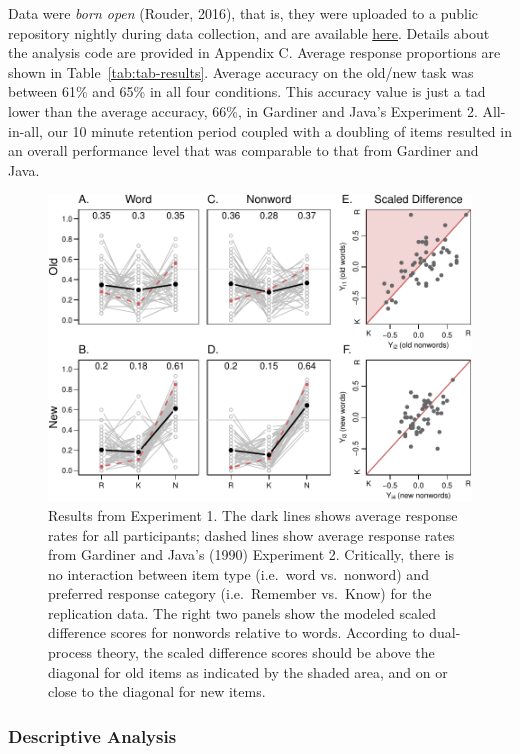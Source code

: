 \documentclass[english,,man,floatsintext]{apa6}
\begin{document}
Data were \emph{born open} (Rouder, 2016), that is, they were uploaded to a public repository nightly during data collection, and are available \href{https://github.com/PerceptionCognitionLab/data1/tree/master/repGardinerJava/RKN_replication/RKN_exp1}{here}. Details about the analysis code are provided in Appendix C. Average response proportions are shown in Table~\ref{tab:tab-results}. Average accuracy on the old/new task was between 61\% and 65\% in all four conditions. This accuracy value is just a tad lower than the average accuracy, 66\%, in Gardiner and Java's Experiment 2. All-in-all, our 10 minute retention period coupled with a doubling of items resulted in an overall performance level that was comparable to that from Gardiner and Java.

\begin{figure}
\centering
\includegraphics{p_files/figure-latex/results-1-1.pdf}
\caption{\label{fig:results-1}Results from Experiment 1. The dark lines shows average response rates for all participants; dashed lines show average response rates from Gardiner and Java's (1990) Experiment 2. Critically, there is no interaction between item type (i.e.~word vs.~nonword) and preferred response category (i.e.~Remember vs.~Know) for the replication data. The right two panels show the modeled scaled difference scores for nonwords relative to words. According to dual-process theory, the scaled difference scores should be above the diagonal for old items as indicated by the shaded area, and on or close to the diagonal for new items.}
\end{figure}

\hypertarget{descriptive-analysis}{%
\subsubsection{Descriptive Analysis}\label{descriptive-analysis}}
\end{document}
